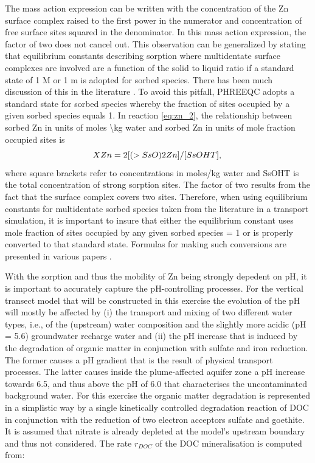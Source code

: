 The mass action expression can be written with the concentration 
of the Zn surface complex raised to
the first power in the numerator and concentration of free surface 
sites squared in the denominator.  
In this mass action expression, the factor of two does not cancel out.  
This observation can be generalized by stating that equilibrium constants describing sorption where multidentate surface complexes are involved are a function of the solid to liquid ratio if a standard
state of 1 M or 1 m is adopted for sorbed species.  
There has been much discussion of this in the literature %
\citep[e.g.,][]{wang_giammar_2013}.  
To avoid this pitfall, PHREEQC adopts a standard state for sorbed species whereby the fraction 
of sites occupied by a given sorbed species equals 1.
In reaction \ref{eq:zn_2}, the relationship between sorbed Zn 
in units of moles \textbackslash kg water and 
sorbed Zn in units of mole fraction occupied 
sites is 
\begin{equation}
XZn = 2[(>SsO)2Zn]/[SsOHT],  \\
\label{eq:xzn}
\end{equation}
where square brackets refer to concentrations in moles/kg water and SsOHT is the total 
concentration of strong sorption sites.  
The factor of two results from the fact that the surface complex covers two sites.  
Therefore, when using equilibrium constants for multidentate sorbed species taken 
from the literature in a transport simulation, it is important to insure 
that either the equilibrium constant uses mole fraction of sites occupied 
by any given sorbed species = 1 or is properly converted to that standard state.  
Formulas for making such conversions are presented 
in various papers 
\citep[e.g.,][]{wang_giammar_2013}.

\par With the sorption and thus the mobility of Zn being strongly 
depedent on pH, it is important to accurately capture the pH-controlling 
processes. For the vertical transect model that will be constructed
in this exercise the evolution of the pH will mostly be 
affected by (i) the transport and mixing of two different water 
types, i.e., of the (upstream) water composition
and the slightly more acidic (pH = 5.6) groundwater recharge water and (ii)
the pH increase that is induced by the degradation of organic matter
in conjunction with sulfate and iron reduction. The former causes
a pH gradient that is the result of physical transport processes. 
The latter causes inside the plume-affected aquifer zone
a pH increase towards 6.5, and thus above the 
pH of 6.0 that characterises the uncontaminated background water. 
For this exercise the organic matter degradation 
is represented in a simplistic way by a single kinetically 
controlled degradation reaction of DOC in conjunction
with the reduction of two electron acceptors sulfate and goethite.
It is assumed that nitrate is already depleted at the model's 
upstream boundary and thus not considered.
The rate $r_{DOC}$ of the DOC mineralisation is computed from:

